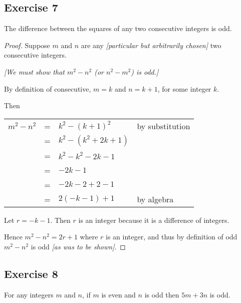 \documentclass[14pt]{extarticle}
\newcommand{\cy}{\color{cyan}}
\begin{document}
\subsection{Exercise 7}
The difference between the squares of any two consecutive integers is odd.

\begin{proof}
    Suppose $m$ and $n$ are any {\it [particular but arbitrarily chosen]} two consecutive integers.

        {\it [We must show that $m^2-n^2$ (or $n^2-m^2$) is odd.]}

    By definition of consecutive, $m = k$ and $n = k+1$, for some integer $k$.

    Then

    \begin{center}
        \begin{tabular}{rcll}
            $m^2-n^2$ & = & $k^2 - (k+1)^2$        & \cy by substitution \\
                      & = & $k^2 - (k^2 + 2k + 1)$ &                     \\
                      & = & $k^2 - k^2 - 2k - 1$   &                     \\
                      & = & $-2k-1$                &                     \\
                      & = & $-2k-2+2-1$            &                     \\
                      & = & $2(-k-1)+1$            & \cy by algebra      \\
        \end{tabular}
    \end{center}

    Let $r = -k-1$. Then $r$ is an integer because it is a difference of integers.

    Hence $m^2 - n^2 = 2r+1$ where $r$ is an integer, and thus by definition of odd $m^2-n^2$ is odd {\it [as was to be shown]}.
\end{proof}

\subsection{Exercise 8}
For any integers $m$ and $n$, if $m$ is even and $n$ is odd
then $5m + 3n$ is odd.
\end{document}
